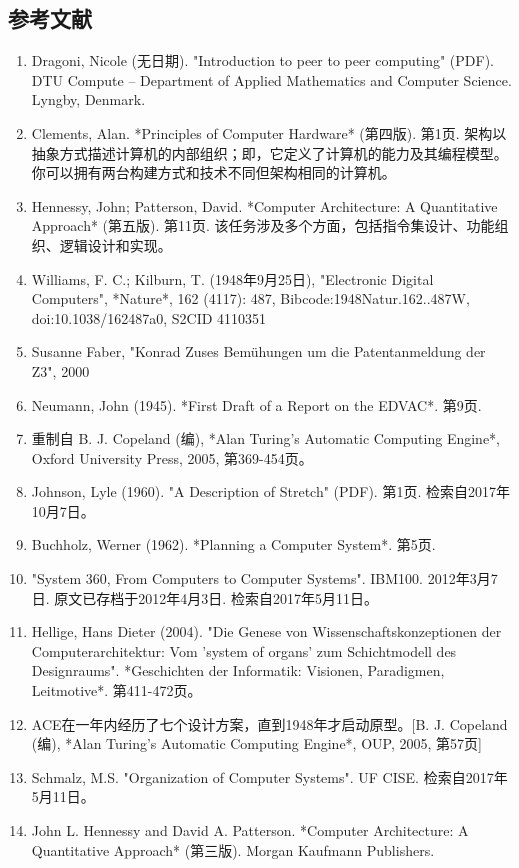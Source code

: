 \subsection{参考文献}  
\begin{enumerate}
\item Dragoni, Nicole (无日期). "Introduction to peer to peer computing" (PDF). DTU Compute – Department of Applied Mathematics and Computer Science. Lyngby, Denmark.  
\item Clements, Alan. *Principles of Computer Hardware* (第四版). 第1页. 架构以抽象方式描述计算机的内部组织；即，它定义了计算机的能力及其编程模型。你可以拥有两台构建方式和技术不同但架构相同的计算机。  
\item Hennessy, John; Patterson, David. *Computer Architecture: A Quantitative Approach* (第五版). 第11页. 该任务涉及多个方面，包括指令集设计、功能组织、逻辑设计和实现。  
\item Williams, F. C.; Kilburn, T. (1948年9月25日), "Electronic Digital Computers", *Nature*, 162 (4117): 487, Bibcode:1948Natur.162..487W, doi:10.1038/162487a0, S2CID 4110351  
\item Susanne Faber, "Konrad Zuses Bemühungen um die Patentanmeldung der Z3", 2000  
\item Neumann, John (1945). *First Draft of a Report on the EDVAC*. 第9页.  
\item 重制自 B. J. Copeland (编), *Alan Turing's Automatic Computing Engine*, Oxford University Press, 2005, 第369-454页。  
\item Johnson, Lyle (1960). "A Description of Stretch" (PDF). 第1页. 检索自2017年10月7日。  
\item Buchholz, Werner (1962). *Planning a Computer System*. 第5页.  
\item "System 360, From Computers to Computer Systems". IBM100. 2012年3月7日. 原文已存档于2012年4月3日. 检索自2017年5月11日。  
\item Hellige, Hans Dieter (2004). "Die Genese von Wissenschaftskonzeptionen der Computerarchitektur: Vom 'system of organs' zum Schichtmodell des Designraums". *Geschichten der Informatik: Visionen, Paradigmen, Leitmotive*. 第411-472页。  
\item ACE在一年内经历了七个设计方案，直到1948年才启动原型。[B. J. Copeland (编), *Alan Turing's Automatic Computing Engine*, OUP, 2005, 第57页]  
\item Schmalz, M.S. "Organization of Computer Systems". UF CISE. 检索自2017年5月11日。  
\item John L. Hennessy and David A. Patterson. *Computer Architecture: A Quantitative Approach* (第三版). Morgan Kaufmann Publishers.  

\end{enumerate}
